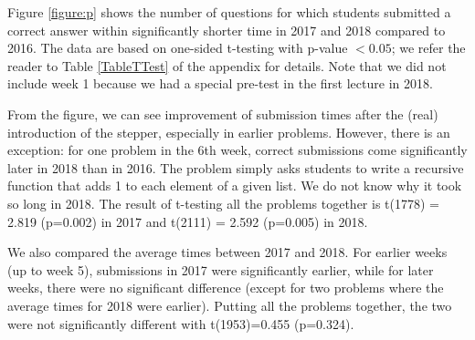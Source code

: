 Figure \ref{figure:p} shows the number of questions for which students submitted a correct answer within significantly shorter time in 2017 and 2018 compared to 2016.  The data are based on one-sided t-testing with p-value $< 0.05$; we refer the reader to Table \ref{TableTTest} of the appendix for details.
Note that we did not include week 1 because we had a special pre-test in the first lecture in 2018.

From the figure, we can see improvement of submission times after the (real) introduction of the stepper, especially in earlier problems.
However, there is an exception: for one problem in the 6th week, correct submissions come significantly later in 2018 than in 2016.
The problem simply asks students to write a recursive function that adds 1 to each
element of a given list.
We do not know why it took so long in 2018.
The result of t-testing all the problems together is t(1778) = 2.819 (p=0.002) in 2017 and t(2111) = 2.592 (p=0.005) in 2018.

We also compared the average times between 2017 and 2018.
For earlier weeks (up to week 5), submissions in 2017 were
significantly earlier, while for later weeks,
there were no significant difference
(except for two problems where the average
times for 2018 were earlier).
Putting all the problems together, the two were not significantly
different with t(1953)=0.455 (p=0.324).

